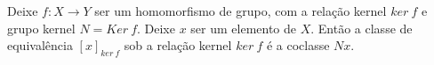 \begin{stat}
  Deixe $f: X\to Y$ ser um homomorfismo de grupo, com a relação kernel $ker\ f$ e grupo kernel $N=Ker\ f$. Deixe $x$ ser um elemento de $X$. Então a classe de equivalência $[x]_{ker\ f}$ sob a relação kernel $ker\ f$ é a coclasse $Nx$.
\end{stat}





